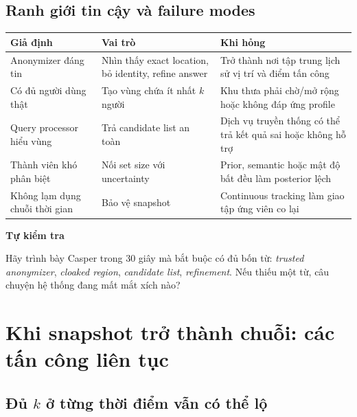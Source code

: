 \documentclass[11pt,a4paper,oneside]{report}
\newenvironment{exercisebox}[1][Tự kiểm tra]{%
  \par\medskip\noindent\begin{lrbox}{\exercisestore}\begin{minipage}{.89\textwidth}
  {\sffamily\bfseries\color{amber}#1}\par\smallskip}{%
  \end{minipage}\end{lrbox}\begin{center}\setlength{\fboxsep}{7pt}%
  \fcolorbox{amber}{lightamber}{\usebox{\exercisestore}}\end{center}\medskip}
\begin{document}
\section{Ranh giới tin cậy và failure modes}

\begin{center}
\begin{minipage}{\textwidth}
\centering
\small
{}
\label{tab:casper-failures}
\begin{tabularx}{\textwidth}{P{4.2cm}Y Y}
\toprule
\textbf{Giả định} & \textbf{Vai trò} & \textbf{Khi hỏng}\\
\midrule
Anonymizer đáng tin & Nhìn thấy exact location, bỏ identity, refine answer & Trở thành nơi tập trung lịch sử vị trí và điểm tấn công\\
Có đủ người dùng thật & Tạo vùng chứa ít nhất $k$ người & Khu thưa phải chờ/mở rộng hoặc không đáp ứng profile\\
Query processor hiểu vùng & Trả candidate list an toàn & Dịch vụ truyền thống có thể trả kết quả sai hoặc không hỗ trợ\\
Thành viên khó phân biệt & Nối set size với uncertainty & Prior, semantic hoặc mật độ bất đều làm posterior lệch\\
Không lạm dụng chuỗi thời gian & Bảo vệ snapshot & Continuous tracking làm giao tập ứng viên co lại\\
\bottomrule
\end{tabularx}
\end{minipage}
\end{center}

\begin{exercisebox}
Hãy trình bày Casper trong 30 giây mà bắt buộc có đủ bốn từ: \emph{trusted
anonymizer}, \emph{cloaked region}, \emph{candidate list}, \emph{refinement}.
Nếu thiếu một từ, câu chuyện hệ thống đang mất mắt xích nào?
\end{exercisebox}

\chapter{Khi snapshot trở thành chuỗi: các tấn công liên tục}

\section{Đủ \texorpdfstring{$k$}{k} ở từng thời điểm vẫn có thể lộ}
\end{document}
